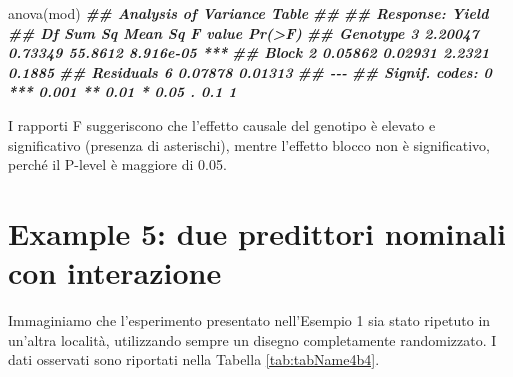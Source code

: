 \documentclass[
  12pt,
]{book}
\newenvironment{Shaded}{\begin{snugshade}}{\end{snugshade}}
\newcommand{\DocumentationTok}[1]{\textcolor[rgb]{0.56,0.35,0.01}{\textbf{\textit{#1}}}}
\newcommand{\FunctionTok}[1]{\textcolor[rgb]{0.00,0.00,0.00}{#1}}
\newcommand{\NormalTok}[1]{#1}
\begin{document}
\begin{Shaded}
\begin{Highlighting}[]
\FunctionTok{anova}\NormalTok{(mod)}
\DocumentationTok{\#\# Analysis of Variance Table}
\DocumentationTok{\#\# }
\DocumentationTok{\#\# Response: Yield}
\DocumentationTok{\#\#           Df  Sum Sq Mean Sq F value    Pr(\textgreater{}F)    }
\DocumentationTok{\#\# Genotype   3 2.20047 0.73349 55.8612 8.916e{-}05 ***}
\DocumentationTok{\#\# Block      2 0.05862 0.02931  2.2321    0.1885    }
\DocumentationTok{\#\# Residuals  6 0.07878 0.01313                      }
\DocumentationTok{\#\# {-}{-}{-}}
\DocumentationTok{\#\# Signif. codes:  0 \textquotesingle{}***\textquotesingle{} 0.001 \textquotesingle{}**\textquotesingle{} 0.01 \textquotesingle{}*\textquotesingle{} 0.05 \textquotesingle{}.\textquotesingle{} 0.1 \textquotesingle{} \textquotesingle{} 1}
\end{Highlighting}
\end{Shaded}

I rapporti F suggeriscono che l'effetto causale del genotipo è elevato e significativo (presenza di asterischi), mentre l'effetto blocco non è significativo, perché il P-level è maggiore di 0.05.

\hypertarget{example-5-due-predittori-nominali-con-interazione}{%
\section{Example 5: due predittori nominali con interazione}\label{example-5-due-predittori-nominali-con-interazione}}

Immaginiamo che l'esperimento presentato nell'Esempio 1 sia stato ripetuto in un'altra località, utilizzando sempre un disegno completamente randomizzato. I dati osservati sono riportati nella Tabella \ref{tab:tabName4b4}.
\end{document}
